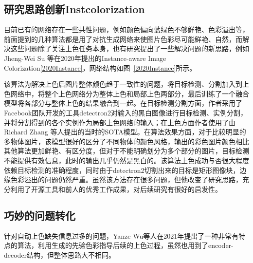 \documentclass[conference]{IEEEtran}
\begin{document}
\subsection{研究思路创新Instcolorization}
目前已有的网络存在一些共性问题，例如颜色偏向蓝绿色不够鲜艳、色彩溢出等，前面提到的几种算法都是用了对抗生成网络来使图片色彩尽可能鲜艳、自然，而解决这些问题除了关注上色任务本身，也有研究提出了一些解决问题的新思路，例如Jheng-Wei Su 等在2020年提出的Instance-aware Image Colorization\ref{2020Instance}，网络结构如图~\ref{2020Instance}所示。

该算法为解决上色后图片整体颜色趋于一致性的问题，将目标检测、分割加入到上色网络中，将整个上色网络分为整体上色和局部上色两部分，最后训练了一个融合模型将各部分与整体上色的结果融合到一起。在目标检测分割方面，作者采用了Facebook团队开发的工具detectron2对输入的黑白图像进行目标检测、实例分割，并将分割得到的各个实例作为局部上色网络的输入；在上色方面作者使用了由Richard Zhang 等人提出的\cite{zhang2017real}当时的SOTA模型。在算法效果方面，对于比较明显的多物体图片，该模型很好的区分了不同物体的颜色风格，输出的彩色图片颜色相比其他算法更加鲜艳、有区分度，但对于不能明确划分为多个部分的图片，目标检测不能提供有效信息，此时的输出几乎仍然是黑白的。该算法上色成功与否很大程度依赖目标检测的准确程度，同时由于detectron2切割出来的目标是矩形图像块，边缘色彩溢出的问题仍然严重。虽然该方法存在很多问题，但他改变了研究思路，充分利用了开源工具和前人的优秀工作成果，对后续研究有很好的启发性。

\subsection{巧妙的问题转化}
针对自动上色缺失信息过多的问题，Yanze Wu等人\cite{wu2021towards}在2021年提出了一种非常有特点的算法，利用生成的先验色彩指导后续的上色过程，虽然也用到了encoder-decoder结构，但整体思路大不相同。
\end{document}
